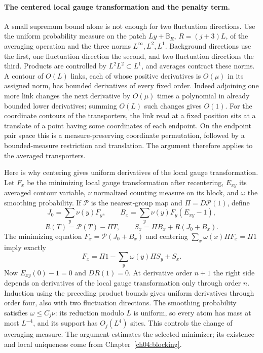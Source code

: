 \paragraph{The centered local gauge transformation and the penalty term.}
A small supremum bound alone is not enough for two fluctuation directions.
Use the uniform probability measure on the patch $Ly+\mathbb B_R$, $R=(j+3)L$, of the averaging operation and the three
norms $L^\infty,L^2,L^1$. Background directions use the first, one fluctuation
direction the second, and two fluctuation directions the third.
Products are controlled by $L^2L^2\subset L^1$, and averages contract
these norms. A contour of $O(L)$ links, each of whose positive derivatives
is $O(\mu)$ in its assigned norm, has bounded derivatives of every fixed
order. Indeed adjoining one more link changes the next derivative by
$O(\mu)$ times a polynomial in already bounded lower derivatives;
summing $O(L)$ such changes gives $O(1)$. For the coordinate contours of the transporters,
the link read at a fixed position sits at a translate of a point having some coordinates of each endpoint.
On the endpoint pair space this is a measure-preserving coordinate
permutation, followed by a bounded-measure restriction and translation.
The argument therefore applies to the averaged transporters.

Here is why centering gives uniform derivatives of the local gauge transformation. Let $F_x$ be the
minimizing local gauge transformation after recentering, $E_{xy}$ its averaged contour variable,
$\nu$ normalized counting measure on its block, and $\omega$ the
smoothing probability. If $\mathcal P$ is the nearest-group map and
$\Pi=D\mathcal P(1)$, define
\[
 J_0=\sum_y\nu(y)F_y,\qquad
 B_x=\sum_y\nu(y)F_y(E_{xy}-1),
\]
\[
 R(T)=\mathcal P(T)-\Pi T,\qquad
 S_x=\Pi B_x+R(J_0+B_x).
\]
The minimizing equation $F_x=\mathcal P(J_0+B_x)$ and centering
$\sum_x\omega(x)\Pi F_x=\Pi1$ imply exactly
\[
 F_x=\Pi1-\sum_y\omega(y)\Pi S_y+S_x.
\]
Now $E_{xy}(0)-1=0$ and $DR(1)=0$. At derivative order $n+1$ the
right side depends on derivatives of the local gauge transformation only through order $n$.
Induction using the preceding product bounds gives uniform derivatives
through order four, also with two fluctuation directions. The smoothing
probability satisfies $\omega\le C_j\nu$: its reduction modulo $L$
is uniform, so every atom has mass at most $L^{-4}$, and its support
has $O_j(L^4)$ sites. This controls the change of averaging measure.
The argument estimates the selected minimizer; its existence and local
uniqueness come from Chapter~\ref{ch04:blocking}.

